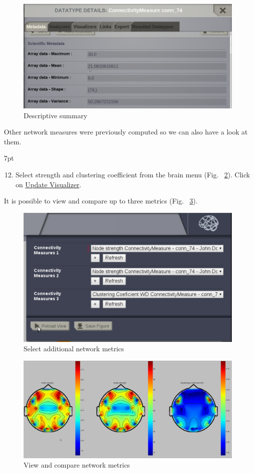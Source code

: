 \documentclass{tufte-handout}
\newenvironment{formal}{%
  \def\FrameCommand{%
    \hspace{1pt}%
    {\color{DarkBlue}\vrule width 2pt}%
    {\color{formalshade}\vrule width 4pt}%
    \colorbox{formalshade}%
  }%
  \MakeFramed{\advance\hsize-\width\FrameRestore}%
  \noindent\hspace{-4.55pt}%
  \begin{adjustwidth}{}{7pt}%
  \vspace{2pt}\vspace{2pt}%
}
{%
  \vspace{2pt}\end{adjustwidth}\endMakeFramed%
}
\begin{document}
\begin{figure}[h]
  \includegraphics[width=\linewidth]{Handout_UI_ModellingStructuralLesions_AnalysisResult}%
  \caption{Descriptive summary}%
  \label{fig:step_02}%
\end{figure}

\noindent Other network measures were previously computed so we can also have a look at them. 
\begin{formal}
  \begin{enumerate}[resume] %
  \setcounter{enumi}{11}
  \item Select strength and clustering coefficient from the brain menu (Fig. ~\ref{fig:step_05}). Click on \underline{Update Visualizer}.
  \end{enumerate}
\end{formal}
\noindent It is possible to view and compare up to three metrics (Fig. ~\ref{fig:step_05b}).
\begin{figure}[h]
  \includegraphics[width=0.5\linewidth]{Handout_UI_ModellingStructuralLesions_AnalysisView}%
  \caption{Select additional network metrics}%
  \label{fig:step_05}%
\end{figure}

\begin{figure}[h]
  \includegraphics[width=0.9\linewidth]{Handout_UI_ModellingStructuralLesions_AnalysisResultCompare}%
  \caption{View and compare network metrics}%
  \label{fig:step_05b}%
\end{figure}
\newpage
\end{document}
